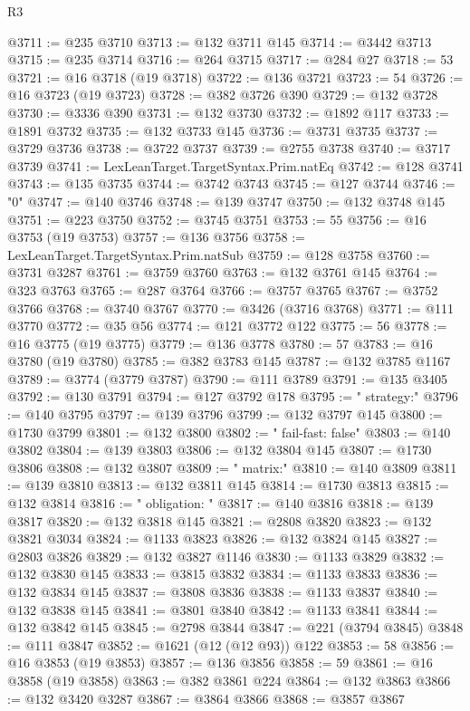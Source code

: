 \begin{lexlean}{R3}
\begin{coremodule}
@3711 := @235 @3710
@3713 := @132 @3711 @145
@3714 := @3442 @3713
@3715 := @235 @3714
@3716 := @264 @3715
@3717 := @284 @27
@3718 := 53
@3721 := @16 @3718 (@19 @3718)
@3722 := @136 @3721
@3723 := 54
@3726 := @16 @3723 (@19 @3723)
@3728 := @382 @3726 @390
@3729 := @132 @3728
@3730 := @3336 @390
@3731 := @132 @3730
@3732 := @1892 @117
@3733 := @1891 @3732
@3735 := @132 @3733 @145
@3736 := @3731 @3735
@3737 := @3729 @3736
@3738 := @3722 @3737
@3739 := @2755 @3738
@3740 := @3717 @3739
@3741 := LexLeanTarget.TargetSyntax.Prim.natEq
@3742 := @128 @3741
@3743 := @135 @3735
@3744 := @3742 @3743
@3745 := @127 @3744
@3746 := "0"
@3747 := @140 @3746
@3748 := @139 @3747
@3750 := @132 @3748 @145
@3751 := @223 @3750
@3752 := @3745 @3751
@3753 := 55
@3756 := @16 @3753 (@19 @3753)
@3757 := @136 @3756
@3758 := LexLeanTarget.TargetSyntax.Prim.natSub
@3759 := @128 @3758
@3760 := @3731 @3287
@3761 := @3759 @3760
@3763 := @132 @3761 @145
@3764 := @323 @3763
@3765 := @287 @3764
@3766 := @3757 @3765
@3767 := @3752 @3766
@3768 := @3740 @3767
@3770 := @3426 (@3716 @3768)
@3771 := @111 @3770
@3772 := @35 @56
@3774 := @121 @3772 @122
@3775 := 56
@3778 := @16 @3775 (@19 @3775)
@3779 := @136 @3778
@3780 := 57
@3783 := @16 @3780 (@19 @3780)
@3785 := @382 @3783 @145
@3787 := @132 @3785 @1167
@3789 := @3774 (@3779 @3787)
@3790 := @111 @3789
@3791 := @135 @3405
@3792 := @130 @3791
@3794 := @127 @3792 @178
@3795 := "    strategy:"
@3796 := @140 @3795
@3797 := @139 @3796
@3799 := @132 @3797 @145
@3800 := @1730 @3799
@3801 := @132 @3800
@3802 := "      fail-fast: false"
@3803 := @140 @3802
@3804 := @139 @3803
@3806 := @132 @3804 @145
@3807 := @1730 @3806
@3808 := @132 @3807
@3809 := "      matrix:"
@3810 := @140 @3809
@3811 := @139 @3810
@3813 := @132 @3811 @145
@3814 := @1730 @3813
@3815 := @132 @3814
@3816 := "        obligation: "
@3817 := @140 @3816
@3818 := @139 @3817
@3820 := @132 @3818 @145
@3821 := @2808 @3820
@3823 := @132 @3821 @3034
@3824 := @1133 @3823
@3826 := @132 @3824 @145
@3827 := @2803 @3826
@3829 := @132 @3827 @1146
@3830 := @1133 @3829
@3832 := @132 @3830 @145
@3833 := @3815 @3832
@3834 := @1133 @3833
@3836 := @132 @3834 @145
@3837 := @3808 @3836
@3838 := @1133 @3837
@3840 := @132 @3838 @145
@3841 := @3801 @3840
@3842 := @1133 @3841
@3844 := @132 @3842 @145
@3845 := @2798 @3844
@3847 := @221 (@3794 @3845)
@3848 := @111 @3847
@3852 := @1621 (@12 (@12 @93)) @122
@3853 := 58
@3856 := @16 @3853 (@19 @3853)
@3857 := @136 @3856
@3858 := 59
@3861 := @16 @3858 (@19 @3858)
@3863 := @382 @3861 @224
@3864 := @132 @3863
@3866 := @132 @3420 @3287
@3867 := @3864 @3866
@3868 := @3857 @3867

\end{coremodule}
\end{lexlean}
